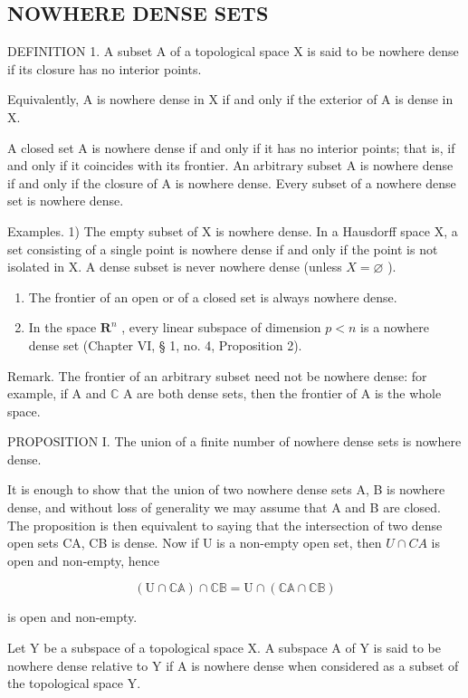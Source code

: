 \subsection{NOWHERE DENSE SETS}

DEFINITION 1. A subset A of a topological space X is said to be nowhere dense if its closure has no interior points.

Equivalently, A is nowhere dense in X if and only if the exterior of A is dense in X.

A closed set A is nowhere dense if and only if it has no interior points; that is, if and only if it coincides with its frontier. An arbitrary subset A is nowhere dense if and only if the closure of A is nowhere dense. Every subset of a nowhere dense set is nowhere dense.

Examples. 1) The empty subset of X is nowhere dense. In a Hausdorff space X, a set consisting of a single point is nowhere dense if and only if the point is not isolated in X. A dense subset is never nowhere dense (unless \(X = \varnothing\) ).

\begin{enumerate}
\def\labelenumi{\arabic{enumi})}
\setcounter{enumi}{1}
\item
  The frontier of an open or of a closed set is always nowhere dense.
\item
  In the space \(\mathbf{R}^n\) , every linear subspace of dimension \(p < n\) is a nowhere dense set (Chapter VI, § 1, no. 4, Proposition 2).
\end{enumerate}

Remark. The frontier of an arbitrary subset need not be nowhere dense: for example, if A and \(\mathbb{C}\) A are both dense sets, then the frontier of A is the whole space.

PROPOSITION I. The union of a finite number of nowhere dense sets is nowhere dense.

It is enough to show that the union of two nowhere dense sets A, B is nowhere dense, and without loss of generality we may assume that A and B are closed. The proposition is then equivalent to saying that the intersection of two dense open sets CA, CB is dense. Now if U is a non-empty open set, then \(U \cap CA\) is open and non-empty, hence

\[
\left(\mathrm{U} \cap \mathbb {C A}\right) \cap \mathbb {C B} = \mathrm{U} \cap \left(\mathbb {C A} \cap \mathbb {C B}\right)
\]

is open and non-empty.

Let Y be a subspace of a topological space X. A subspace A of Y is said to be nowhere dense relative to Y if A is nowhere dense when considered as a subset of the topological space Y.

